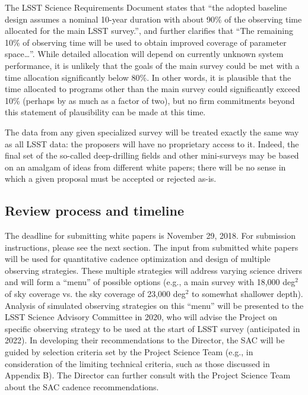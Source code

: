 \documentclass[DM,lsstdraft,toc,usenatbib]{lsstdoc}
\begin{document}
The LSST Science Requirements Document states that ``the adopted baseline design assumes a 
nominal 10-year duration with about 90\% of the observing time allocated for the main LSST survey.'',
and further clarifies that ``The remaining 10\% of observing time will be used to obtain improved 
coverage of parameter space\dots''. While detailed allocation will depend on currently unknown system
performance, it is unlikely that the goals of the main survey could be met with a time allocation
significantly below 80\%. In other words, it is plausible that the time allocated to programs other
than the main survey could significantly exceed 10\% (perhaps by as much as a factor of two), but 
no firm commitments beyond this statement of plausibility can be made at this time. 

The data from any given specialized survey will be treated exactly the same way as all LSST 
data: the proposers will have no proprietary access to it.  Indeed, the final set of the so-called
deep-drilling fields and other mini-surveys may be based on an amalgam of ideas from different 
white papers; there will be no sense in which a given proposal must be accepted or rejected as-is.  


\subsection{Review process and timeline}

The deadline for submitting white papers is November 29, 2018. For submission instructions, 
please see the next section. The input from submitted white papers will be used for quantitative 
cadence optimization and design of multiple observing strategies. These multiple strategies 
will address varying science drivers and will form a ``menu'' of possible options (e.g., a main 
survey with 18,000 deg$^2$ of sky coverage vs. the sky coverage of 23,000 deg$^2$ to 
somewhat shallower depth). Analysis of simulated observing strategies on this ``menu''
will be presented to the LSST Science Advisory Committee in 2020, who will advise the Project 
on specific observing strategy to be used at the start of LSST survey (anticipated in 2022). 
In developing their recommendations to the Director, the SAC will be guided by selection 
criteria set by the Project Science Team  (e.g., in consideration of the limiting technical criteria,
such as those discussed in Appendix B). The Director can further consult with the Project Science 
Team about the SAC cadence recommendations. 
\end{document}
